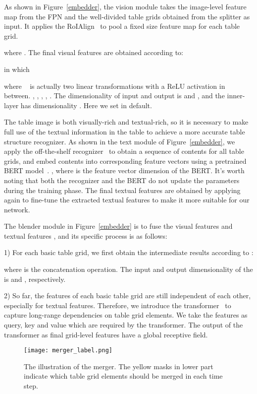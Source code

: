 \documentclass[review]{elsarticle}
\begin{document}
As shown in Figure~\ref{embedder}, the vision module takes the image-level feature map  from the FPN and the well-divided table grids  obtained from the splitter as input. It applies the RoIAlign~\cite{MaskRCNN} to pool a fixed size  feature map  for each table grid.

where . The final visual features  are obtained according to:

in which

where ~\cite{Transformer} is actually two linear transformations with a ReLU activation in between. , , , , . The dimensionality of input and output is  and , and the inner-layer has dimensionality . Here we set  in default.

The table image is both visually-rich and textual-rich, so it is necessary to make full use of the textual information in the table to achieve a more accurate table structure recognizer. As shown in the text module of Figure~\ref{embedder}, we apply the off-the-shelf recognizer~\cite{WAP} to obtain a sequence of  contents for all table grids, and embed contents into corresponding feature vectors  using a pretrained BERT model~\cite{Bert}. , where  is the feature vector dimension of the BERT. It's worth noting that both the recognizer and the BERT do not update the parameters during the training phase. The final textual features  are obtained by applying  again to fine-tune the extracted textual features  to make it more suitable for our network.


The blender module in Figure~\ref{embedder} is to fuse the visual features  and textual features , and its specific process is as follows:

1) For each basic table grid, we first obtain the intermediate results  according to :

where  is the concatenation operation. The input and output dimensionality of the  is  and , respectively.

2) So far, the features of each basic table grid are still independent of each other, especially for textual features. Therefore, we introduce the transformer~\cite{Transformer} to capture long-range dependencies on table grid elements. We take the features  as query, key and value which are required by the transformer. The output of the transformer as final grid-level features  have a global receptive field.


\begin{figure*}[htb]
	\centerline{\texttt{[image: merger\_label.png]}}
	\caption{The illustration of the merger. The yellow masks in lower part indicate which table grid elements should be merged in each time step.}
	\label{mergerlabel}
\end{figure*}
\end{document}
